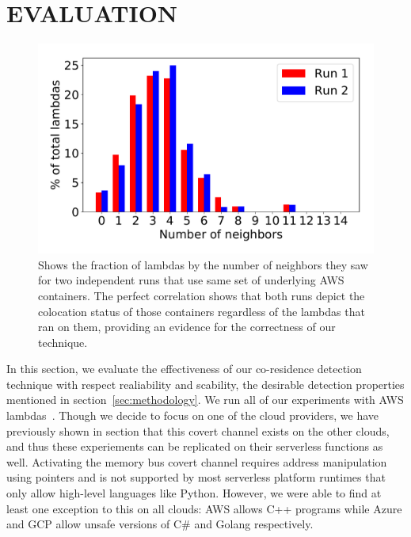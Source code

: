 \section{EVALUATION}
\label{sec:eval}

\begin{figure}[!t]
  \includegraphics[width=.99\linewidth]{fig/correlation.pdf}
  \caption{Shows the fraction of lambdas by the number of neighbors they saw for two 
  independent runs that use same set of underlying AWS containers. The perfect correlation 
  shows that both runs depict the colocation status of those containers regardless of the 
  lambdas that ran on them, 
  providing an evidence for the correctness of our technique. 
\label{fig:correlation}}
\end{figure}

In this section, we evaluate the effectiveness of our co-residence detection
technique with respect realiability and scability, the desirable detection
properties mentioned in section~\ref{sec:methodology}.  We run all of our
experiments with AWS lambdas~\cite{awscloud}. Though we decide to focus on one
of the cloud providers, we have previously shown in section that this
covert channel exists on the other clouds, and thus these experiements can be
replicated on their serverless functions as well.  Activating the memory bus covert channel requires address
manipulation using pointers and is not supported by most serverless platform
runtimes that only allow high-level languages like Python.  However, we were
able to find at least one exception to this on all clouds: AWS allows C++
programs while Azure and GCP allow unsafe versions of C\# and Golang
respectively. 

